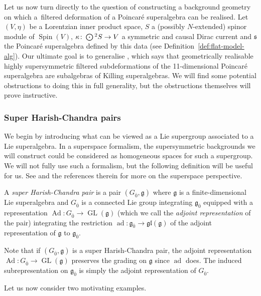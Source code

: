 \documentclass[11pt]{article}
\numberwithin{equation}{section}
\numberwithin{equation}{section}
\newcommand{\fg}{\mathfrak{g}}
\newcommand{\fs}{\mathfrak{s}}
\newcommand{\fgl}{\mathfrak{gl}}
\newcommand{\Odot}{\mathchoice{{\textstyle\bigodot}}{\bigodot}{\bigodot}{\bigodot}}
\newcommand{\1}{\mathbbm{1}}
\DeclareMathOperator{\GL}{GL}
\DeclareMathOperator{\Spin}{Spin}
\DeclareMathOperator{\Ad}{Ad}
\DeclareMathOperator{\ad}{ad}
\begin{document}
Let us now turn directly to the question of constructing a background geometry on which a~filtered deformation of a Poincar\'e superalgebra can be realised. Let $(V,\eta)$ be a Lorentzian inner product space, $S$ a (possibly $N$-extended) spinor module of $\Spin(V)$, $\kappa\colon \Odot^2 S\to V$ a symmetric and causal Dirac current and $\fs$ the Poincar\'e superalgebra defined by this data (see Definition~\ref{def:flat-model-alg}). Our ultimate goal is to generalise \cite[Theorem~13]{Figueroa-OFarrill2017_1}, which says that geometrically realisable highly supersymmetric filtered subdeformations of the 11-dimensional Poincar\'e superalgebra are subalgebras of Killing superalgebras. We will find some potential obstructions to doing this in full generality, but the obstructions themselves will prove instructive.

\subsubsection{Super Harish-Chandra pairs}

We begin by introducing what can be viewed as a Lie supergroup associated to a Lie superalgebra. In a superspace formalism, the supersymmetric backgrounds we will construct could be considered as homogeneous spaces for such a supergroup. We will not fully use such a formalism, but the following definition will be useful for us. See \cite{Santi2010} and the references therein for more on the superspace perspective.

\begin{Definition}\label{def:super-Harish-Chandra}
	A \emph{super Harish-Chandra pair} is a pair $(G_{\overline0},\fg)$ where $\fg$ is a finite-dimensional Lie superalgebra and $G_{\overline0}$ is a connected Lie group integrating $\fg_{\overline0}$ equipped with a representation $\Ad\colon G_{\overline0}\to\GL(\fg)$ (which we call the \emph{adjoint representation} of the pair) integrating the restriction $\ad\colon\fg_{\overline0}\to\fgl(\fg)$ of the adjoint representation of $\fg$ to $\fg_{\overline0}$.
\end{Definition}

Note that if $(G_{\overline0},\fg)$ is a super Harish-Chandra pair, the adjoint representation $\Ad\colon G_{\overline0}\to\GL(\fg)$ preserves the grading on $\fg$ since $\ad$ does. The induced subrepresentation on $\fg_{\overline0}$ is simply the adjoint representation of $G_{\overline0}$.

Let us now consider two motivating examples.
\end{document}
